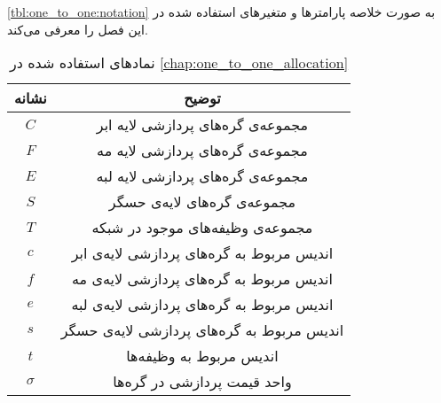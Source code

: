     \cref{tbl:one_to_one:notation} به صورت خلاصه پارامتر‌ها و متغیر‌های استفاده شده در این فصل را معرفی می‌کند.
    \begin{table}[h]
      \caption{نماد‌های استفاده شده در \cref{chap:one_to_one_allocation}}
      \begin{tabularx}{\textwidth}{|c|C|} \hline
        نشانه                & توضیح                                                                                     \\ \hline
        $C$                  & مجموعه‌ی گره‌های پردازشی لایه ابر                                                                       \\ \hline
        $F$                  & مجموعه‌ی گره‌های پردازشی لایه مه                                                                       \\ \hline
        $E$                  & مجموعه‌ی گره‌های پردازشی لایه لبه                                                                       \\ \hline
        $S$                  & مجموعه‌ی گره‌های لایه‌ی حسگر                                                                     \\ \hline                        
        $T$                  & مجموعه‌ی وظیفه‌های موجود در شبکه                                                                  \\ \hline
		$c$                  & اندیس مربوط به گره‌های پردازشی لایه‌ی ابر                                                                       \\ \hline
		$f$                  & اندیس مربوط به گره‌های پردازشی لایه‌ی مه                                                                       \\ \hline
		$e$                  & اندیس مربوط به گره‌های پردازشی لایه‌ی لبه                                                                       \\ \hline
		$s$                  & اندیس مربوط به گره‌های پردازشی لایه‌ی حسگر                                                                     \\ \hline                        
		$t$                  & اندیس مربوط به وظیفه‌ها                                                                  \\ \hline
        $\sigma$        	 & واحد قیمت پردازشی در گره‌ها                                                                \\ \hline
        

\end{tabularx}
\end{table}
